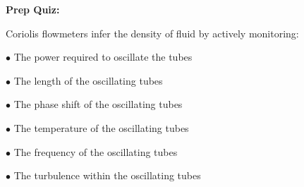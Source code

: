 \vfil \eject

\noindent
{\bf Prep Quiz:}

Coriolis flowmeters infer the density of fluid by actively monitoring:

\medskip
\item{$\bullet$} The power required to oscillate the tubes
\vskip 5pt 
\item{$\bullet$} The length of the oscillating tubes
\vskip 5pt 
\item{$\bullet$} The phase shift of the oscillating tubes
\vskip 5pt 
\item{$\bullet$} The temperature of the oscillating tubes
\vskip 5pt 
\item{$\bullet$} The frequency of the oscillating tubes
\vskip 5pt 
\item{$\bullet$} The turbulence within the oscillating tubes
\medskip







